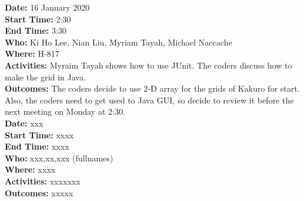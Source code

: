 \documentclass[12pt]{article}
\begin{document}
{\bf Date:} 16 January 2020\\
{\bf Start Time:} 2:30\\
{\bf End Time:} 3:30 \\
{\bf Who:} Ki Ho Lee, Nian Liu, Myriam Tayah, Michael Naccache\\
{\bf Where:} H-817 \\
{\bf Activities:} Myraim Tayah shows how to use JUnit. The coders discuss how to make the grid in Java.\\
{\bf Outcomes:} The coders decide to use 2-D array for the grids of Kakuro for start. Also, the coders need to get used to Java GUI, so decide to review it before the next meeting on Monday at 2:30.\\

{\bf Date:} xxx\\
{\bf Start Time:} xxxx\\
{\bf End Time:} xxxx \\
{\bf Who:} xxx,xx,xxx (fullnames)\\
{\bf Where:} xxxx \\
{\bf Activities:} xxxxxxx\\
{\bf Outcomes:} xxxxx\\

\end{document}
